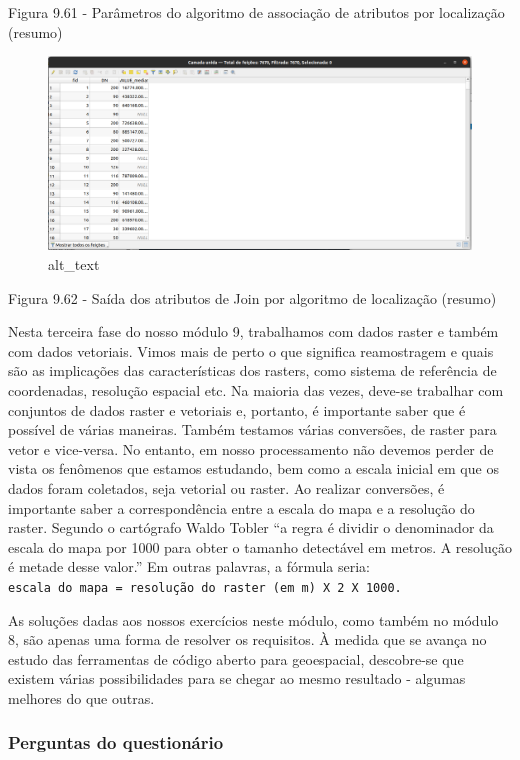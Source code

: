 \documentclass[
]{book}
\begin{document}
Figura 9.61 - Parâmetros do algoritmo de associação de atributos por localização (resumo)

\begin{figure}
\centering
\includegraphics{media/modulo9/fig962.png}
\caption{alt\_text}
\end{figure}

Figura 9.62 - Saída dos atributos de Join por algoritmo de localização (resumo)

Nesta terceira fase do nosso módulo 9, trabalhamos com dados raster e também com dados vetoriais. Vimos mais de perto o que significa reamostragem e quais são as implicações das características dos rasters, como sistema de referência de coordenadas, resolução espacial etc. Na maioria das vezes, deve-se trabalhar com conjuntos de dados raster e vetoriais e, portanto, é importante saber que é possível de várias maneiras. Também testamos várias conversões, de raster para vetor e vice-versa. No entanto, em nosso processamento não devemos perder de vista os fenômenos que estamos estudando, bem como a escala inicial em que os dados foram coletados, seja vetorial ou raster. Ao realizar conversões, é importante saber a correspondência entre a escala do mapa e a resolução do raster. Segundo o cartógrafo Waldo Tobler ``a regra é dividir o denominador da escala do mapa por 1000 para obter o tamanho detectável em metros. A resolução é metade desse valor.'' Em outras palavras, a fórmula seria: \texttt{escala\ do\ mapa\ =\ resolução\ do\ raster\ (em\ m)\ X\ 2\ X\ 1000.}

As soluções dadas aos nossos exercícios neste módulo, como também no módulo 8, são apenas uma forma de resolver os requisitos. À medida que se avança no estudo das ferramentas de código aberto para geoespacial, descobre-se que existem várias possibilidades para se chegar ao mesmo resultado - algumas melhores do que outras.

\hypertarget{perguntas-do-questionuxe1rio-20}{%
\subsubsection{Perguntas do questionário}\label{perguntas-do-questionuxe1rio-20}}
\end{document}
